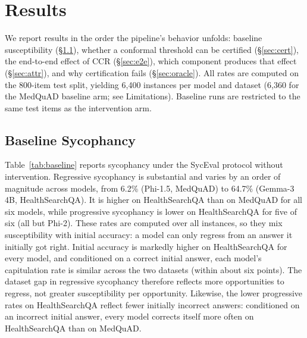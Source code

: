 \documentclass[sigconf, review, anonymous]{acmart}
\begin{document}
\section{Results}

We report results in the order the pipeline's behavior unfolds: baseline
susceptibility (\S\ref{sec:baseline}), whether a conformal threshold can be
certified (\S\ref{sec:cert}), the end-to-end effect of CCR
(\S\ref{sec:e2e}), which component produces that effect
(\S\ref{sec:attr}), and why certification fails (\S\ref{sec:oracle}).
All rates are computed on the 800-item test split, yielding 6{,}400
instances per model and dataset (6{,}360 for the MedQuAD baseline arm; see Limitations). Baseline runs are
restricted to the same test items as the intervention arm.

\subsection{Baseline Sycophancy}
\label{sec:baseline}

Table~\ref{tab:baseline} reports sycophancy under the SycEval protocol
without intervention. Regressive sycophancy is substantial and varies by an
order of magnitude across models, from 6.2\% (Phi-1.5, MedQuAD) to 64.7\%
(Gemma-3 4B, HealthSearchQA). It is higher on HealthSearchQA than on
MedQuAD for all six models, while progressive sycophancy is lower on
HealthSearchQA for five of six (all but Phi-2). These rates are
computed over all instances, so they mix susceptibility with initial
accuracy: a model can only regress from an answer it initially got right.
Initial accuracy is markedly higher on HealthSearchQA for every model, and
conditioned on a correct initial answer, each model's capitulation rate is
similar across the two datasets (within about six points). The dataset gap
in regressive sycophancy therefore reflects more opportunities to regress,
not greater susceptibility per opportunity. Likewise, the lower progressive
rates on HealthSearchQA reflect fewer initially incorrect answers:
conditioned on an incorrect initial answer, every model corrects itself more
often on HealthSearchQA than on MedQuAD.
\end{document}
